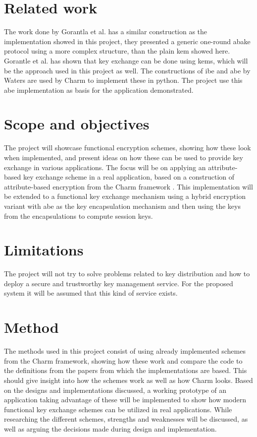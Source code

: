 \section{Related work}\label{sec:related_work}
The work done by Gorantla et al.\cite{gorantla2010attribute} has a similar construction as the implementation showed in this project, they presented a generic one-round \gls{abake} protocol using a more complex structure, than the plain \gls{kem} showed here. Gorantle et al. \cite{kem-group-ke} has shown that key exchange can be done using \glspl{kem}, which will be the approach used in this project as well. The constructions of \gls{ibe} and \gls{abe} by Waters \cite{ibe_waters09, abe_waters09} are used by Charm\cite{DBLP:Charm13} to implement these in python. The project use this \gls{abe} implementation as basis for the application demonstrated. 

\section{Scope and objectives}\label{sec:scope}

The project will showcase functional encryption schemes, showing how these look when implemented, and present ideas on how these can be used to provide key exchange in various applications. The focus will be on applying an attribute-based key exchange scheme in a real application, based on a construction of attribute-based encryption from the Charm framework \cite{DBLP:Charm13}. This implementation will be extended to a functional key exchange mechanism using a hybrid encryption variant with \gls{abe} as the key encapsulation mechanism and then using the keys from the encapsulations to compute session keys.


\section{Limitations}\label{sec:limitations}
The project will not try to solve problems related to key distribution and how to deploy a secure and trustworthy key management service. For the proposed system it will be assumed that this kind of service exists.

\section{Method}
The methods used in this project consist of using already implemented schemes from the Charm framework, showing how these work and compare the code to the definitions from the papers from which the implementations are based. This should give insight into how the schemes work as well as how Charm looks. Based on the designs and implementations discussed, a working prototype of an application taking advantage of these will be implemented to show how modern functional key exchange schemes can be utilized in real applications. While researching the different schemes, strengths and weaknesses will be discussed, as well as arguing the decisions made during design and implementation.


